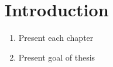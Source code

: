 \chapter{Introduction}

\begin{enumerate}
  \item Present each chapter
  \item Present goal of thesis
\end{enumerate}
